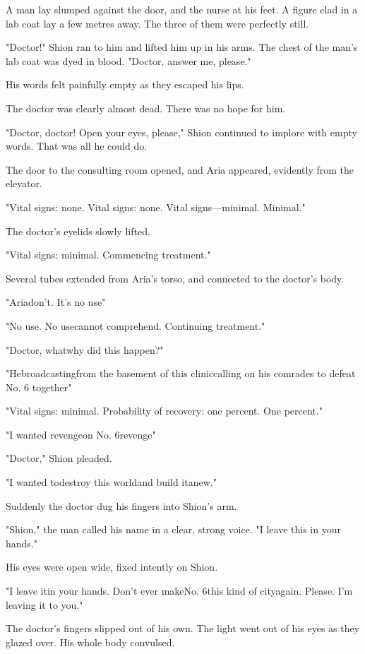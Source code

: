 A man lay slumped against the door, and the nurse at his feet. A figure
clad in a lab coat lay a few metres away. The three of them were
perfectly still.

"Doctor!" Shion ran to him and lifted him up in his arms. The chest of
the man's lab coat was dyed in blood. "Doctor, answer me, please."

His words felt painfully empty as they escaped his lips.

The doctor was clearly almost dead. There was no hope for him.

"Doctor, doctor! Open your eyes, please," Shion continued to implore
with empty words. That was all he could do.

The door to the consulting room opened, and Aria appeared, evidently
from the elevator.

{\sffamily "Vital signs: none. Vital signs: none. Vital signs---minimal. Minimal."}

The doctor's eyelids slowly lifted.

{\sffamily "Vital signs: minimal. Commencing treatment."}

Several tubes extended from Aria's torso, and connected to the doctor's
body.

"Aria\el don't. It's no use\el "

{\sffamily "No use. No use\el cannot comprehend. Continuing treatment."}

"Doctor, what\el why did this happen?"

"\el He\el broadcasting\el from the basement of this clinic\el calling\el 
on his comrades to defeat No. 6 together\el "

{\sffamily "Vital signs: minimal. Probability of recovery: one percent. One
percent."}

"I wanted revenge\el on No. 6\el revenge\el "

"Doctor," Shion pleaded.

"I wanted to\el destroy this world\el and build it\el anew."

Suddenly the doctor dug his fingers into Shion's arm.

"Shion," the man called his name in a clear, strong voice. "I leave this
in your hands."

His eyes were open wide, fixed intently on Shion.

"I leave it\el in your hands. Don't ever make\el No. 6\el this kind of
city\el again. Please. I'm leaving it to you."

The doctor's fingers slipped out of his own. The light went out of his
eyes as they glazed over. His whole body convulsed.

